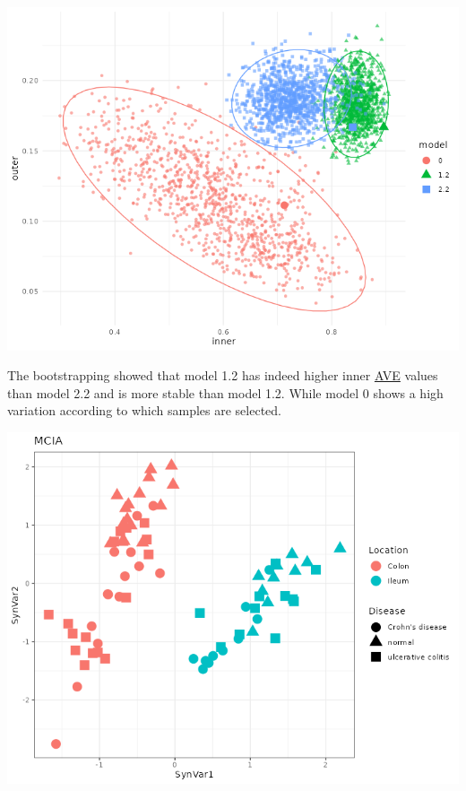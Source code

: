 \documentclass[
  12pt,
  a4paper,
  twoside,
  openright]{book}
\let\origfigure\figure
\let\endorigfigure\endfigure
\renewenvironment{figure}[1][2] {
    \expandafter\origfigure\expandafter[!htbp]
} {
    \endorigfigure
}
\begin{document}
\begin{figure}
\includegraphics[width=1\linewidth]{images/howells_models_bootstrap} \caption[Bootstrap of models in the Howell dataset.]{Bootstrap of models in the Howell dataset. Bootstrap of the different models on the inner and outer AVE: Model 0 has just trancriptomic and microbiome data, model 1.2 has transcriptomic, microbiome and sample data and model 2.2 has transcriptomic, microbiome and sample data split in different blocks. The bigger points are the models on the original dataset. Each point represents a bootstrapped sample (colored by model used). The dispersion is shown by the ellipses.}\label{fig:howell-bootstrap}
\end{figure}

The bootstrapping showed that model 1.2 has indeed higher inner \protect\hyperlink{acronyms_AVE}{AVE} values than model 2.2 and is more stable than model 1.2.
While model 0 shows a high variation according to which samples are selected.

\begin{figure}
\includegraphics[width=1\linewidth]{images/howell-mcia} \caption[MCIA dimensions in the Howell dataset.]{MCIA dimensions in the Howell dataset. The first dimensions separates by location. Each point represents a sample (colored by location and shape by disease).}\label{fig:howell-mcia}
\end{figure}
\end{document}
